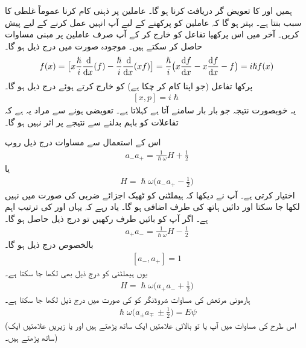 ہمیں  اور  کا تعویض گر دریافت کرنا ہو گا۔  عاملین پر ذہنی کام کرنا عموماً غلطی کا سبب بنتا ہے۔ بہتر ہو گا کہ عاملین  کو پرکھنے  کے لیے آپ انہیں   عمل کرنے کے لیے پیش کریں۔ آخر میں اس پرکھیا تفاعل کو خارج کر کے آپ صرف عاملین پر مبنی مساوات حاصل کر سکتے ہیں۔ موجودہ صورت میں درج ذیل ہو گا۔
\begin{align}
[x,p]f(x)=\big[x\frac{\hslash}{i}\frac{\dif}{\dif{x}}(f)-\frac{\hslash}{i}\frac{\dif}{\dif{x}}(xf)\big ]=\frac{\hslash}{i}\big (x\frac{\dif{f}}{\dif{x}}-x\frac{\dif{f}}{\dif{x}}-f\big )=i\hslash f(x)
\end{align}
پرکھا  تفاعل (جو اپنا کام کر چکا ہے)    کو خارج کرتے ہوئے درج ذیل ہو گا۔
\begin{align}\label{مساوات_غیر_تابع_شروڈنگر_مقام_معیار_حرکت_تبادل_کار}
[x,p]=i\hslash
\end{align}
یہ خوبصورت نتیجہ جو بار بار سامنے آتا ہے  کہلاتا ہے۔ تعویضی ہونے سے مراد یہ ہے کہ تفاعلات کو باہم بدلنے سے نتیجے پر اثر نہیں ہو گا۔

اس کے استعمال سے مساوات   درج ذیل روپ 
\begin{align}
a_{-}a_{+}=\frac{1}{\hslash\omega}H+\frac{1}{2}
\end{align}
یا
\begin{align}
H=\hslash\omega\big (a_{-}a_{+}-\frac{1}{2} \big )
\end{align}
اختیار کرتی ہے۔ آپ نے دیکھا کہ ہیملٹنی کو ٹھیک اجزائے ضربی کی صورت میں نہیں لکھا جا سکتا اور دائیں ہاتھ کی طرف  اضافی  ہو گا۔ یاد رہے کہ  یہاں  اور  کی ترتیب   اہم ہے۔ اگر آپ  کو بائیں طرف رکھیں تو درج ذیل حاصل ہو گا۔
\begin{align}
a_{+}a_{-}=\frac{1}{\hslash\omega}H-\frac{1}{2}
\end{align}
بالخصوص درج ذیل ہو گا۔
\begin{align}\label{مساوات_شروڈنگر_سیڑھی_ضرب_برابر_اکائی}
[a_{-},a_{+}]=1
\end{align}
یوں ہیملٹنی کو درج ذیل بھی لکھا جا سکتا ہے۔
\begin{align}
H=\hslash\omega\big (a_{+}a_{-}+\frac{1}{2}\big )
\end{align}
ہارمونی مرتعش کی مساوات شروڈنگر کو  کی صورت میں درج ذیل لکھا جا سکتا ہے۔
\begin{align}\label{مساوات_شروڈنگر_عوامل_روپ}
 \hslash \omega \big(a_{\pm} a_{\mp} \,\pm \frac{1}{2}\big)=E\psi 		
\end{align}
(اس طرح کی مساوات میں آپ یا تو بالائی علامتیں ایک ساتھ پڑھتے ہیں اور یا زیریں علامتیں ایک ساتھ پڑھتے ہیں۔)

